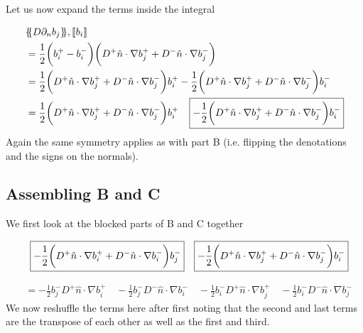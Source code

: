 \documentclass[11pt,letterpaper,titlepage]{article}
\newcommand*{\ldblbrace}{\{\mskip-5mu\{}
\newcommand*{\rdblbrace}{\}\mskip-5mu\}}
\numberwithin{equation}{section}
\begin{document}
Let us now expand the terms inside the integral

\begin{equation*}
\begin{aligned}
 &\ldblbrace D \partial_n b_j \rdblbrace,\llbracket b_i \rrbracket \\
 &= \frac{1}{2}\biggr(b_i^+ - b_i^-\biggr)\biggr(D^+\hat{n}\cdot\nabla b_j^+ + D^-\hat{n}\cdot\nabla b_j^-\biggr)\\
 &= \frac{1}{2}\biggr(D^+\hat{n}\cdot\nabla b_j^+ + D^-\hat{n}\cdot\nabla b_j^-\biggr)b_i^+
- \frac{1}{2}\biggr(D^+\hat{n}\cdot\nabla b_j^+ + D^-\hat{n}\cdot\nabla b_j^-\biggr)b_i^-\\
 &= \frac{1}{2}\biggr(D^+\hat{n}\cdot\nabla b_j^+ + D^-\hat{n}\cdot\nabla b_j^-\biggr)b_i^+
 \Aboxed{
- \frac{1}{2}\biggr(D^+\hat{n}\cdot\nabla b_j^+ + D^-\hat{n}\cdot\nabla b_j^-\biggr)b_i^-}
\end{aligned}
\end{equation*}
\newline
Again the same symmetry applies as with part B (i.e. flipping the denotations and the signs on the normals).

\subsection{Assembling B and C}
We first look at the blocked parts of B and C together

\begin{equation*}
\begin{aligned}
 &\Aboxed{
  - \frac{1}{2}\biggr(D^+\hat{n}\cdot\nabla b_i^+ + D^-\hat{n}\cdot\nabla b_i^-\biggr)b_j^-} \quad
 \Aboxed{
- \frac{1}{2}\biggr(D^+\hat{n}\cdot\nabla b_j^+ + D^-\hat{n}\cdot\nabla b_j^-\biggr)b_i^-}\\
\end{aligned}
\end{equation*}

\begin{equation*}
\begin{aligned}
&=
- \frac{1}{2} b_j^- D^+\hat{n}\cdot\nabla b_i^+ \quad
- \frac{1}{2} b_j^- D^-\hat{n}\cdot\nabla b_i^- \quad
- \frac{1}{2} b_i^- D^+\hat{n}\cdot\nabla b_j^+ \quad
- \frac{1}{2} b_i^- D^-\hat{n}\cdot\nabla b_j^- 
\end{aligned}
\end{equation*}
\newline
We now reshuffle the terms here after first noting that the second and last terms are the transpose of each other as well as the first and third.
\end{document}

